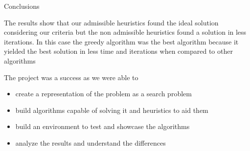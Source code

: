 \begin{frame}{Conclusions}
    
    The results show that our admissible heuristics found the ideal solution considering our criteria but the non admissible heuristics found a solution in less iterations. In this case the greedy algorithm was the best algorithm because it yielded the best solution in less time and iterations when compared to other algorithms
    
    The project was a success as we were able to
    \begin{itemize}
        \item create a representation of the problem as a search problem
        \item build algorithms capable of solving it and heuristics to aid them
        \item build an environment to test and showcase the algorithms 
        \item analyze the results and understand the differences 
    \end{itemize}
    
\end{frame}